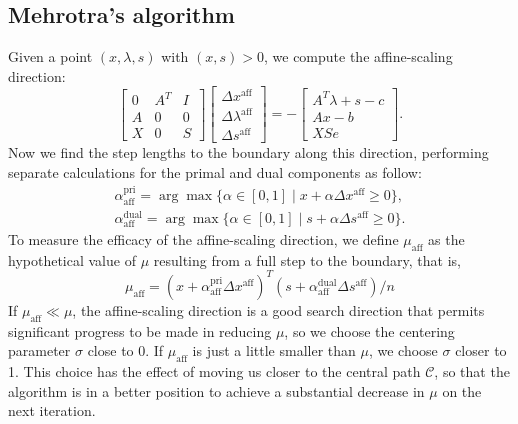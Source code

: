 \documentclass[a4paper,10 pt,titlepage,twoside]{book}
\theoremstyle{plain}
\theoremstyle{definition}
\theoremstyle{remark}
\begin{document}
\subsection{Mehrotra's algorithm}
Given a point $(x, \lambda, s)$ with $(x, s)> 0$, we compute the affine-scaling direction:
\begin{equation}\label{(A)}
\begin{bmatrix}
0&A^{T}&I \\A&0&0\\X&0&S
\end{bmatrix}\begin{bmatrix}
\Delta x^{\text{aff}}\\\Delta\lambda^{\text{aff}}\\\Delta s^{\text{aff}}
\end{bmatrix}=-\begin{bmatrix}
A^{T}\lambda+s-c\\Ax-b\\XSe
\end{bmatrix}.
\end{equation}
Now we find the step lengths to the boundary along this direction, performing separate calculations for the primal and dual components as follow:
\begin{align}\label{Qw}\tag{4.22a}
\alpha_{\text{aff}}^{\text{pri}}=\arg\max\{\alpha\in[0,1]\;|\;x +\alpha\Delta x^{\text{aff}}\geq 0\}, \\
\alpha_{\text{aff}}^{\text{dual}}=\arg\max\{\alpha\in[0,1]\;|\;s +\alpha\Delta s^{\text{aff}}\geq 0\}\tag{4.22b}.
\end{align}
To measure the efficacy of the affine-scaling direction, we define $\mu_{\text{aff}}$ as the hypothetical value of $\mu$ resulting from a full step to the boundary, that is,
\begin{equation*}
	\mu_{\text{aff}}= (x+\alpha_{\text{aff}}^{\text{pri}}\Delta x^{\text{aff}})^{T}(s+\alpha_{\text{aff}}^{\text{dual}}\Delta s^{\text{aff}})/n
\end{equation*}
If $\mu_{\text{aff}}\ll\mu$, the affine-scaling direction is a good search direction that permits significant progress to be made in reducing $\mu$, so we choose the centering parameter $\sigma$ close to 0. If $\mu_{\text{aff}}$ is just a little smaller than $\mu$, we choose $\sigma$ closer to 1. This choice has the effect of moving us closer  to the central path $\mathcal{C}$, so that the algorithm is in a better position to achieve a substantial decrease in $\mu$ on the next iteration.\\
\end{document}
